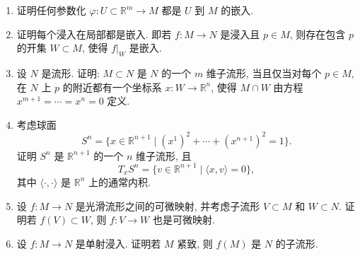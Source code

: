 \begin{RiemannExercise}\label{ex:immersions-embeddings}
\begin{enumerate}[label=(\arabic*),ref=\arabic*,leftmargin=*]
\item\label{ex:parametrizations-are-embeddings} 证明任何参数化 $\varphi:U\subset\mathbb{R}^m\to M$ 都是 $U$ 到 $M$ 的嵌入.
\item\label{ex:immersion-is-locally-an-embedding} 证明每个浸入在局部都是嵌入. 即若 $f:M\to N$ 是浸入且 $p\in M$, 则存在包含 $p$ 的开集 $W\subset M$, 使得 $f|_W$ 是嵌入.
\item\label{ex:coordinate-submanifold-characterization} 设 $N$ 是流形. 证明: $M\subset N$ 是 $N$ 的一个 $m$ 维子流形, 当且仅当对每个 $p\in M$, 在 $N$ 上 $p$ 的附近都有一个坐标系 $x:W\to\mathbb{R}^n$, 使得 $M\cap W$ 由方程 $x^{m+1}=\cdots=x^n=0$ 定义.
\item\label{ex:sphere-as-regular-level-set} 考虑球面
\[
  S^n=\{x\in\mathbb{R}^{n+1}\mid(x^1)^2+\cdots+(x^{n+1})^2=1\}.
\]
证明 $S^n$ 是 $\mathbb{R}^{n+1}$ 的一个 $n$ 维子流形, 且
\[
  T_xS^n=\{v\in\mathbb{R}^{n+1}\mid\langle x,v\rangle=0\},
\]
其中 $\langle\cdot,\cdot\rangle$ 是 $\mathbb{R}^n$ 上的通常内积.
\item\label{ex:restriction-to-submanifolds} 设 $f:M\to N$ 是光滑流形之间的可微映射, 并考虑子流形 $V\subset M$ 和 $W\subset N$. 证明若 $f(V)\subset W$, 则 $f:V\to W$ 也是可微映射.
\item\label{ex:compact-injective-immersion} 设 $f:M\to N$ 是单射浸入. 证明若 $M$ 紧致, 则 $f(M)$ 是 $N$ 的子流形.
\end{enumerate}
\end{RiemannExercise}
